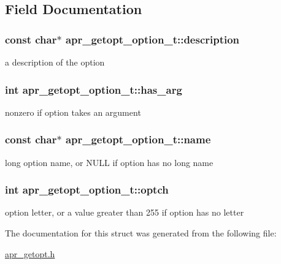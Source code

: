 \subsection{Field Documentation}
\hypertarget{structapr__getopt__option__t_a8fd515c0a9e621f6c0d058772429ab98}{
\subsubsection[{description}]{\setlength{\rightskip}{0pt plus 5cm}const char$\ast$ apr\-\_\-getopt\-\_\-option\-\_\-t\-::description}}\label{structapr__getopt__option__t_a8fd515c0a9e621f6c0d058772429ab98}
a description of the option \hypertarget{structapr__getopt__option__t_aac65dae93f6d35f4848b91f6f9d66278}{
\subsubsection[{has\-\_\-arg}]{\setlength{\rightskip}{0pt plus 5cm}int apr\-\_\-getopt\-\_\-option\-\_\-t\-::has\-\_\-arg}}\label{structapr__getopt__option__t_aac65dae93f6d35f4848b91f6f9d66278}
nonzero if option takes an argument \hypertarget{structapr__getopt__option__t_a7e623913c9761495c5d37adf6ff1ee69}{
\subsubsection[{name}]{\setlength{\rightskip}{0pt plus 5cm}const char$\ast$ apr\-\_\-getopt\-\_\-option\-\_\-t\-::name}}\label{structapr__getopt__option__t_a7e623913c9761495c5d37adf6ff1ee69}
long option name, or N\-U\-L\-L if option has no long name \hypertarget{structapr__getopt__option__t_a476e67c4dde620fe5b4f5952238c6e94}{
\subsubsection[{optch}]{\setlength{\rightskip}{0pt plus 5cm}int apr\-\_\-getopt\-\_\-option\-\_\-t\-::optch}}\label{structapr__getopt__option__t_a476e67c4dde620fe5b4f5952238c6e94}
option letter, or a value greater than 255 if option has no letter 

The documentation for this struct was generated from the following file\-:\begin{DoxyCompactItemize}
\item 
\hyperlink{apr__getopt_8h}{apr\-\_\-getopt.\-h}\end{DoxyCompactItemize}
